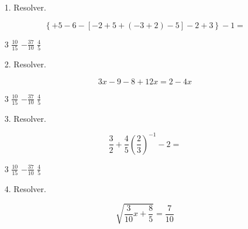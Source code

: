 \documentclass{exam}
\newenvironment{multichoices}[1][2]{%
	\begin{multicols}{#1}}{%
\end{multicols}}
\begin{document}
	\begin{itemize}
		\item[1. ] Resolver.
		
		
		\begin{equation*}
			\left\{+5-6-[-2+5+(-3+2)-5]-2+3\right\}-1 =
		\end{equation*}
		
		\vspace{0.5cm}
		
		\begin{checkboxes}
			\begin{multichoices}[3]
					\choice $\frac{10}{15}$
					\choice $-\frac{37}{10}$
					\choice $\frac{4}{5}$
			\end{multichoices}
		\end{checkboxes}
		
		
		\item[2. ] Resolver.
		
		
		\begin{equation*}
			3x -9-8+12x = 2-4x
		\end{equation*}
		
		\vspace{0.5cm}
		
		\begin{checkboxes}
			\begin{multichoices}[3]
				\choice $\frac{10}{15}$
				\choice $-\frac{37}{10}$
				\choice $\frac{4}{5}$
			\end{multichoices}
		\end{checkboxes}
		
		
		\item[3. ] Resolver.
		
		
		
		\begin{equation*}
			\frac{3}{2} + \frac{4}{5} \left(\frac{2}{3}\right)^{-1} -2 =
		\end{equation*}
		
		\vspace{0.5cm}
		
		\begin{checkboxes}
			\begin{multichoices}[3]
				\choice $\frac{10}{15}$
				\choice $-\frac{37}{10}$
				\choice $\frac{4}{5}$
			\end{multichoices}
		\end{checkboxes}
		
		
		\item[4. ] Resolver. 
		
		
		\begin{equation*}
			\sqrt{\frac{3}{10}x + \frac{8}{5}} = \frac{7}{10}
		\end{equation*}
		

\end{itemize}
\end{document}
